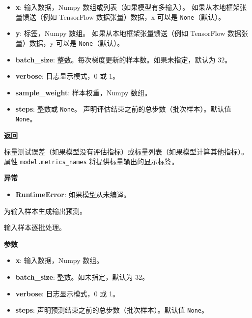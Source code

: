 \begin{itemize}
\tightlist
\item
  \textbf{x}: 输入数据，Numpy 数组或列表（如果模型有多输入）。
  如果从本地框架张量馈送（例如 TensorFlow 数据张量）数据，x 可以是
  \texttt{None}（默认）。
\item
  \textbf{y}: 标签，Numpy 数组。 如果从本地框架张量馈送（例如 TensorFlow
  数据张量）数据，y 可以是 \texttt{None}（默认）。
\item
  \textbf{batch\_size}: 整数。每次梯度更新的样本数。如果未指定，默认为
  32。
\item
  \textbf{verbose}: 日志显示模式，0 或 1。
\item
  \textbf{sample\_weight}: 样本权重，Numpy 数组。
\item
  \textbf{steps}: 整数或 \texttt{None}。
  声明评估结束之前的总步数（批次样本）。默认值 \texttt{None}。
\end{itemize}

\textbf{返回}

标量测试误差（如果模型没有评估指标）或标量列表（如果模型计算其他指标）。
属性 \texttt{model.metrics\_names} 将提供标量输出的显示标签。

\textbf{异常}

\begin{itemize}
\tightlist
\item
  \textbf{RuntimeError}: 如果模型从未编译。
\end{itemize}



\label{predict}

\begin{Shaded}
\begin{Highlighting}[]
\OperatorTok{=}\OperatorTok{=}\OperatorTok{=}\NormalTok{)}
\end{Highlighting}
\end{Shaded}

为输入样本生成输出预测。

输入样本逐批处理。

\textbf{参数}

\begin{itemize}
\tightlist
\item
  \textbf{x}: 输入数据，Numpy 数组。
\item
  \textbf{batch\_size}: 整数。如未指定，默认为 32。
\item
  \textbf{verbose}: 日志显示模式，0 或 1。
\item
  \textbf{steps}: 声明预测结束之前的总步数（批次样本）。默认值
  \texttt{None}。
\end{itemize}

